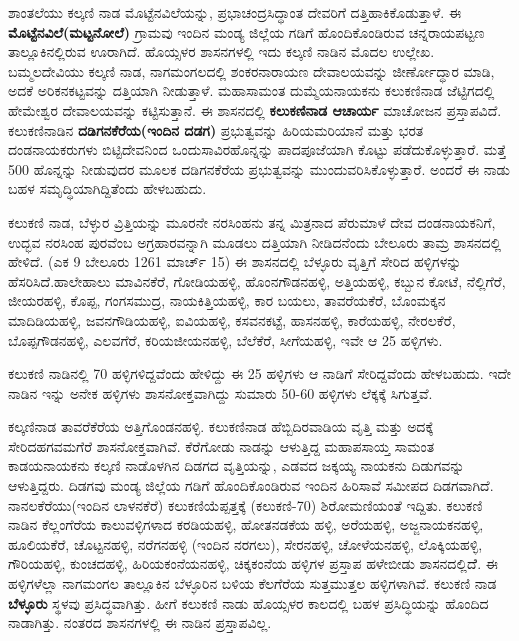 ಶಾಂತಲೆಯು ಕಲ್ಕಣಿ ನಾಡ ಮೊಟ್ಟೆನವಿಲೆಯನ್ನು, ಪ್ರಭಾಚಂದ್ರಸಿದ್ಧಾಂತ ದೇವರಿಗೆ ದತ್ತಿಹಾಕಿಕೊಡುತ್ತಾಳೆ. ಈ \textbf{ಮೊಟ್ಟೆನವಿಲೆ(ಮಟ್ಟನೋಲೆ)} ಗ್ರಾಮವು ಇಂದಿನ ಮಂಡ್ಯ ಜಿಲ್ಲೆಯ ಗಡಿಗೆ ಹೊಂದಿಕೊಂಡಿರುವ ಚನ್ನರಾಯಪಟ್ಟಣ ತಾಲ್ಲೂಕಿನಲ್ಲಿರುವ ಊರಾಗಿದೆ. ಹೊಯ್ಸಳರ ಶಾಸನಗಳಲ್ಲಿ ಇದು ಕಲ್ಕಣಿ ನಾಡಿನ ಮೊದಲ ಉಲ್ಲೇಖ. ಬಮ್ಮಲದೇವಿಯು ಕಲ್ಕಣಿ ನಾಡ, ನಾಗಮಂಗಲದಲ್ಲಿ ಶಂಕರನಾರಾಯಣ ದೇವಾಲಯವನ್ನು ಜೀರ್ಣೋದ್ಧಾರ ಮಾಡಿ, ಅದಕೆ ಅರಿಕನಕಟ್ಟವನ್ನು ದತ್ತಿಯಾಗಿ ನೀಡುತ್ತಾಳೆ. ಮಹಾಸಾಮಂತ ದುಮ್ಮೆಯನಾಯಕನು ಕಲುಕಣಿನಾಡ ಜೆಟ್ಟಿಗದಲ್ಲಿ ಹೇಮೇಶ್ವರ ದೇವಾಲಯವನ್ನು ಕಟ್ಟಿಸುತ್ತಾನೆ. ಈ ಶಾಸನದಲ್ಲಿ \textbf{ಕಲುಕಣಿನಾಡ ಆಚಾರ್ಯ} ಮಾಚೋಜನ ಪ್ರಸ್ತಾಪವಿದೆ. ಕಲುಕಣಿನಾಡಿನ \textbf{ದಡಿಗನಕೆರೆಯ\general{\break }(ಇಂದಿನ ದಡಗ)} ಪ್ರಭುತ್ವವನ್ನು ಹಿರಿಯಮರಿಯಾನೆ ಮತ್ತು ಭರತ ದಂಡನಾಯಕರುಗಳು ಬಿಟ್ಟಿದೇವನಿಂದ ಒಂದುಸಾವಿರ\-ಹೊನ್ನನ್ನು ಪಾದಪೂಜೆಯಾಗಿ ಕೊಟ್ಟು ಪಡೆದುಕೊಳ್ಳುತ್ತಾರೆ. ಮತ್ತೆ 500 ಹೊನ್ನನ್ನು ನೀಡುವುದರ ಮೂಲಕ ದಡಿಗನಕೆರೆಯ ಪ್ರಭುತ್ವವನ್ನು ಮುಂದುವರಿಸಿಕೊಳ್ಳುತ್ತಾರೆ. ಅಂದರೆ ಈ ನಾಡು ಬಹಳ ಸಮೃದ್ಧಿಯಾಗಿದ್ದಿತೆಂದು ಹೇಳಬಹುದು.

ಕಲುಕಣಿ ನಾಡ, ಬೆಳ್ಳುರ ವ್ರಿತ್ತಿಯನ್ನು ಮೂರನೇ ನರಸಿಂಹನು ತನ್ನ ಮಿತ್ರನಾದ ಪೆರುಮಾಳೆ ದೇವ ದಂಡನಾಯಕನಿಗೆ, ಉದ್ಭವ ನರಸಿಂಹ ಪುರವೆಂಬ ಅಗ್ರಹಾರವನ್ನಾಗಿ ಮೂಡಲು ದತ್ತಿಯಾಗಿ ನೀಡಿದನೆಂದು ಬೇಲೂರು ತಾಮ್ರ ಶಾಸನದಲ್ಲಿ ಹೇಳಿದೆ. (ಎಕ 9 ಬೇಲೂರು 1261 ಮಾರ್ಚ್ 15) ಈ ಶಾಸನದಲ್ಲಿ ಬೆಳ್ಳೂರು ವೃತ್ತಿಗೆ ಸೇರಿದ ಹಳ್ಳಿಗಳನ್ನು ಹೆಸರಿಸಿದೆ.\break ಹಾಲೇಹಾಲು ಮಾವಿನಕೆರೆ, ಗೋಡಿಯಹಳ್ಳಿ, ಹೊಂನಗೌಡನಹಳ್ಳಿ, ಅತ್ತಿಯಹಳ್ಳಿ, ಕಬ್ಬುನ ಕೋಟೆ, ನೆಲ್ಲಿಗೆರೆ, ಜೀಯರಹಳ್ಳಿ, ಕೊಪ್ಪ, ಗಂಗಸಮುದ್ರ, ನಾಯಕಿತ್ತಿಯಹಳ್ಳಿ, ಕಾರ ಬಯಲು, ತಾವರೆಯಕೆರೆ, ಬೊಂಮಕ್ಕನ ಮಾದಿಡಿಯಹಳ್ಳಿ, ಜವನಗೌಡಿಯಹಳ್ಳಿ, ಐವಿಯಹಳ್ಳಿ, ಕಸವನಕಟ್ಟೆ, ಹಾಸನಹಳ್ಳಿ, ಕಾರೆಯಹಳ್ಳಿ, ನೇರಲಕೆರೆ, ಬೊಪ್ಪಗೌಡನಹಳ್ಳಿ, ಎಲವಗೆರೆ, ಕರಿಯಜೀಯನಹಳ್ಳಿ, ಬೆಲೆಕೆರೆ, ಸೀಗೆಯಹಳ್ಳಿ, ಇವೇ ಆ 25 ಹಳ್ಳಿಗಳು.

ಕಲುಕಣಿ ನಾಡಿನಲ್ಲಿ 70 ಹಳ್ಳಿಗಳಿದ್ದವೆಂದು ಹೇಳಿದ್ದು ಈ 25 ಹಳ್ಳಿಗಳು ಆ ನಾಡಿಗೆ ಸೇರಿದ್ದವೆಂದು ಹೇಳಬಹುದು. ಇದೇ ನಾಡಿನ ಇನ್ನು ಅನೇಕ ಹಳ್ಳಿಗಳು ಶಾಸನೋಕ್ತವಾಗಿದ್ದು ಸುಮಾರು 50-60 ಹಳ್ಳಿಗಳು ಲೆಕ್ಕಕ್ಕೆ ಸಿಗುತ್ತವೆ.

ಕಲ್ಕಣಿನಾಡ ತಾವರೆಕೆರೆಯ ಅತ್ತಿಗೊಂಡನಹಳ್ಳಿ. ಕಲುಕಣಿನಾಡ ಹೆಬ್ಬಿದಿರವಾಡಿಯ ವೃತ್ತಿ ಮತ್ತು ಅದಕ್ಕೆ ಸೇರಿದ\break ಹಗವಮಗೆರೆ ಶಾಸನೋಕ್ತವಾಗಿವೆ. ಕೆರೆಗೋಡು ನಾಡನ್ನು ಆಳುತ್ತಿದ್ದ ಮಹಾಪಸಾಯ್ತ ಸಾಮಂತ ಕಾಡಯನಾಯಕನು ಕಲ್ಕಣಿ ನಾಡೊಳಗಿನ ದಿಡಗದ ವೃತ್ತಿಯನ್ನು, ಎಡವದ ಜಕ್ಕಯ್ಯ ನಾಯಕನು ದಿಡುಗವನ್ನು ಆಳುತ್ತಿದ್ದರು. ದಿಡಗವು ಮಂಡ್ಯ ಜಿಲ್ಲೆಯ ಗಡಿಗೆ ಹೊಂದಿಕೊಂಡಿರುವ ಇಂದಿನ ಹಿರಿಸಾವೆ ಸಮೀಪದ ದಿಡಗವಾಗಿದೆ. ನಾನಲಕೆರೆಯು(ಇಂದಿನ ಲಾಳನಕೆರೆ) ಕಲುಕಣಿಯೆಪ್ಪತ್ತಕ್ಕೆ (ಕಲುಕಣಿ-70) ಶಿರೋಮಣಿಯಂತೆ ಇದ್ದಿತು. ಕಲುಕಣಿ ನಾಡಿನ ಕೆಲ್ಲಂಗೆರೆಯ ಕಾಲುವಳ್ಳಿಗಳಾದ ಕರಡಿಯಹಳ್ಳಿ, ಹೋತನಡಕೆಯ ಹಳ್ಳಿ, ಅರೆಯಹಳ್ಳಿ, ಅಜ್ಜನಾಯಕನಹಳ್ಳಿ, ಹೂಲಿಯಕೆರೆ, ಚೊಟ್ಟನಹಳ್ಳಿ, ನರೆಗನಹಳ್ಳಿ (ಇಂದಿನ ನರಗಲು), ಸೇರನಹಳ್ಳಿ, ಚೋಳೆಯನಹಳ್ಳಿ, ಲೊಕ್ಕಿಯಹಳ್ಳಿ, ಗೌರಿಯಹಳ್ಳಿ, ಕುಂಚದಹಳ್ಳಿ, ಹಿರಿಯಕಂನೆಯನಹಳ್ಳಿ, ಚಿಕ್ಕಕಂನೆಯ ಹಳ್ಳಿಗಳ ಪ್ರಸ್ತಾಪ ಹಳೇಬೀಡು ಶಾಸನದಲ್ಲಿದೆೆ. ಈ ಹಳ್ಳಿಗಳೆಲ್ಲಾ ನಾಗಮಂಗಲ ತಾಲ್ಲೂಕಿನ ಬೆಳ್ಳೂರಿನ ಬಳಿಯ ಕೆಲಗೆರೆಯ ಸುತ್ತಮುತ್ತಲ ಹಳ್ಳಿಗಳಾಗಿವೆ. ಕಲುಕಣಿ ನಾಡ \textbf{ಬೆಳ್ಳೂರು} ಸ್ಥಳವು ಪ್ರಸಿದ್ಧವಾಗಿತ್ತು. ಹೀಗೆ ಕಲುಕಣಿ ನಾಡು ಹೊಯ್ಸಳರ ಕಾಲದಲ್ಲಿ ಬಹಳ ಪ್ರಸಿದ್ಧಿಯನ್ನು ಹೊಂದಿದ ನಾಡಾಗಿತ್ತು. ನಂತರದ ಶಾಸನಗಳಲ್ಲಿ ಈ ನಾಡಿನ ಪ್ರಸ್ತಾಪವಿಲ್ಲ.

